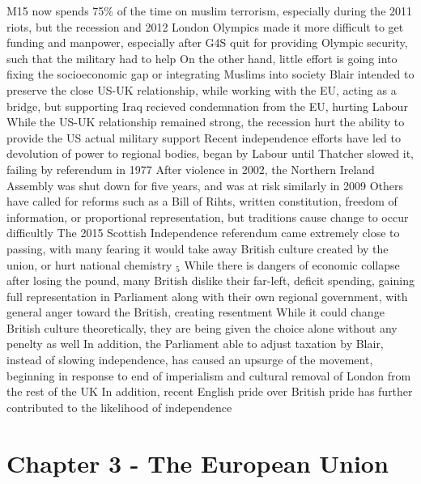 \documentclass[11 pt, twoside]{article}
\newcommand{\foot}[1]{\hyperlink{#1}{$_#1$}}
\newenvironment{outline*}
{
	\begin{outline}[enumerate]
	}
	{\end{outline}
}
\begin{document}
\begin{outline*}
\2 M15 now spends 75\% of the time on muslim terrorism, especially during the 2011 riots, but the recession and 2012 London Olympics made it more difficult to get funding and manpower, especially after G4S quit for providing Olympic security, such that the military had to help
\2 On the other hand, little effort is going into fixing the socioeconomic gap or integrating Muslims into society
\1 Blair intended to preserve the close US-UK relationship, while working with the EU, acting as a bridge, but supporting Iraq recieved condemnation from the EU, hurting Labour
\2 While the US-UK relationship remained strong, the recession hurt the ability to provide the US actual military support
\1 Recent independence efforts have led to devolution of power to regional bodies, began by Labour until Thatcher slowed it, failing by referendum in 1977
\2 After violence in 2002, the Northern Ireland Assembly was shut down for five years, and was at risk similarly in 2009
\2 Others have called for reforms such as a Bill of Rihts, written constitution, freedom of information, or proportional representation, but traditions cause change to occur difficultly
\2 The 2015 Scottish Independence referendum came extremely close to passing, with many fearing it would take away British culture created by the union, or hurt national chemistry \foot{5}
\3 While there is dangers of economic collapse after losing the pound, many British dislike their far-left, deficit spending, gaining full representation in Parliament along with their own regional government, with general anger toward the British, creating resentment
\3 While it could change British culture theoretically, they are being given the choice alone without any penelty as well
\3 In addition, the Parliament able to adjust taxation by Blair, instead of slowing independence, has caused an upsurge of the movement, beginning in response to end of imperialism and cultural removal of London from the rest of the UK
\3 In addition, recent English pride over British pride has further contributed to the likelihood of independence
\end{outline*}
\section{Chapter 3 - The European Union}
\end{document}

